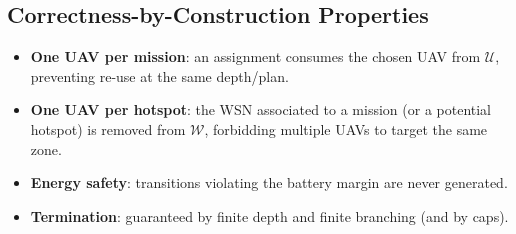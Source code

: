 

\subsection*{Correctness-by-Construction Properties}
\begin{itemize}
  \item \textbf{One UAV per mission}: an assignment consumes the chosen UAV from
        \(\mathcal{U}\), preventing re-use at the same depth/plan.
  \item \textbf{One UAV per hotspot}: the WSN associated to a mission (or a potential hotspot)
        is removed from \(\mathcal{W}\), forbidding multiple UAVs to target the same zone.
  \item \textbf{Energy safety}: transitions violating the battery margin are never generated.
  \item \textbf{Termination}: guaranteed by finite depth and finite branching (and by caps).
\end{itemize}

